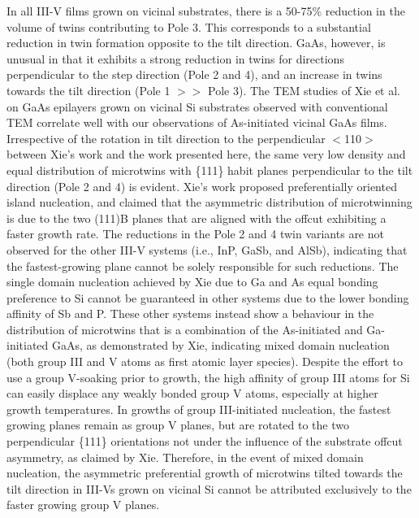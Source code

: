 In all III-V films grown on vicinal substrates, there is a 50-75\% reduction in the volume of twins contributing to Pole 3.
This corresponds to a substantial reduction in twin formation opposite to the tilt direction.
GaAs, however, is unusual in that it exhibits a strong reduction in twins for directions perpendicular to the step direction (Pole 2 and 4), and an increase in twins towards the tilt direction (Pole 1 \(>>\) Pole 3).
The TEM studies of Xie et al.\cite{Xie1990} on GaAs epilayers grown on vicinal Si substrates observed with conventional TEM correlate well with our observations of As-initiated vicinal GaAs films.
Irrespective of the rotation in tilt direction to the perpendicular \(<\)110\(>\) between Xie's work and the work presented here, the same very low density and equal distribution of microtwins with \{111\} habit planes perpendicular to the tilt direction (Pole 2 and 4) is evident.
Xie's work proposed preferentially oriented island nucleation, and claimed that the asymmetric distribution of microtwinning is due to the two (111)B planes that are aligned with the offcut exhibiting a faster growth rate.
The reductions in the Pole 2 and 4 twin variants are not observed for the other III-V systems (i.e.,
InP, GaSb, and AlSb), indicating that the fastest-growing plane cannot be solely responsible for such reductions.
The single domain nucleation achieved by Xie due to Ga and As equal bonding preference to Si\cite{Bringans1988} cannot be guaranteed in other systems due to the lower bonding affinity of Sb\cite{Kubiak1985} and P\cite{Kiyota2001}.
These other systems instead show a behaviour in the distribution of microtwins that is a combination of the As-initiated and Ga-initiated GaAs, as demonstrated by Xie, indicating mixed domain nucleation (both group III and V atoms as first atomic layer species).
Despite the effort to use a group V-soaking prior to growth, the high affinity of group III atoms for Si can easily displace any weakly bonded group V atoms, especially at higher growth temperatures.
In growths of group III-initiated nucleation, the fastest growing planes remain as group V planes, but are rotated to the two perpendicular \{111\} orientations not under the influence of the substrate offcut asymmetry, as claimed by Xie.
Therefore, in the event of mixed domain nucleation, the asymmetric preferential growth of microtwins tilted towards the tilt direction in III-Vs grown on vicinal Si cannot be attributed exclusively to the faster growing group V planes.

